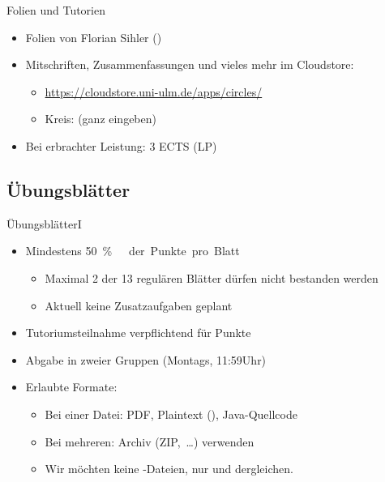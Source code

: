 \begin{frame}[t]{Folien und Tutorien}
    \begin{itemize}[<+(1)->]
        \itemsep=18pt
        \item Folien von Florian Sihler ()
        \item Mitschriften, Zusammenfassungen und vieles mehr im Cloudstore: \begin{itemize}[<1->]
            \item \url{https://cloudstore.uni-ulm.de/apps/circles/}
            \item Kreis:  (ganz eingeben)
        \end{itemize}
        \item Bei erbrachter Leistung: 3 ECTS (LP)
    \end{itemize}
\end{frame}


\savebox{}
\savebox{}
\subsection{Übungsblätter}
\begin{frame}[t]{Übungsblätter\hfill I}
\begin{itemize}[<+(1)->]
    \item Mindestens \qty{50}\percent\ der Punkte pro Blatt\begin{itemize}
        \itemsep=2.5pt
        \item Maximal 2 der 13 regulären Blätter dürfen nicht bestanden werden
        \item Aktuell keine Zusatzaufgaben geplant\vfill
    \end{itemize}
    \item Tutoriumsteilnahme verpflichtend für Punkte\vfill
    \item Abgabe in zweier Gruppen (Montags, 11:59\;Uhr) \vfill
    \item<7-> Erlaubte Formate: {\begin{itemize}
        \itemsep=2.5pt
        \item<8-> Bei einer Datei: PDF, Plaintext (), Java-Quellcode
        \item<9-> Bei mehreren: Archiv (ZIP,~\ldots) verwenden
        \item<10-> Wir möchten keine -Dateien, nur  und dergleichen.
    \end{itemize}}\vfill
\end{itemize}
\end{frame}


